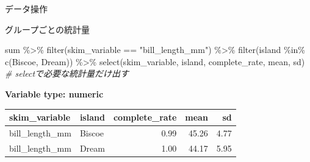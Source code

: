 \documentclass[
  ignorenonframetext,
]{beamer}
\newenvironment{Shaded}{\begin{snugshade}}{\end{snugshade}}
\newcommand{\CommentTok}[1]{\textcolor[rgb]{0.56,0.35,0.01}{\textit{#1}}}
\newcommand{\FunctionTok}[1]{\textcolor[rgb]{0.00,0.00,0.00}{#1}}
\newcommand{\NormalTok}[1]{#1}
\newcommand{\SpecialCharTok}[1]{\textcolor[rgb]{0.00,0.00,0.00}{#1}}
\newcommand{\StringTok}[1]{\textcolor[rgb]{0.31,0.60,0.02}{#1}}
\begin{document}
\begin{frame}[fragile]{データ操作}
\begin{block}{グループごとの統計量}
\begin{Shaded}
\begin{Highlighting}[]
\NormalTok{sum }\SpecialCharTok{\%\textgreater{}\%}
  \FunctionTok{filter}\NormalTok{(skim\_variable }\SpecialCharTok{==} \StringTok{"bill\_length\_mm"}\NormalTok{) }\SpecialCharTok{\%\textgreater{}\%}
  \FunctionTok{filter}\NormalTok{(island }\SpecialCharTok{\%in\%} \FunctionTok{c}\NormalTok{(}\StringTok{\textquotesingle{}Biscoe\textquotesingle{}}\NormalTok{, }\StringTok{\textquotesingle{}Dream\textquotesingle{}}\NormalTok{)) }\SpecialCharTok{\%\textgreater{}\%}
  \FunctionTok{select}\NormalTok{(skim\_variable, island, complete\_rate, mean, sd) }\CommentTok{\# selectで必要な統計量だけ出す}
\end{Highlighting}
\end{Shaded}

\textbf{Variable type: numeric}

\begin{longtable}[]{@{}llrrr@{}}
\toprule
skim\_variable & island & complete\_rate & mean & sd \\
\midrule
\endhead
bill\_length\_mm & Biscoe & 0.99 & 45.26 & 4.77 \\
bill\_length\_mm & Dream & 1.00 & 44.17 & 5.95 \\
\bottomrule
\end{longtable}
\end{block}
\end{frame}
\end{document}
